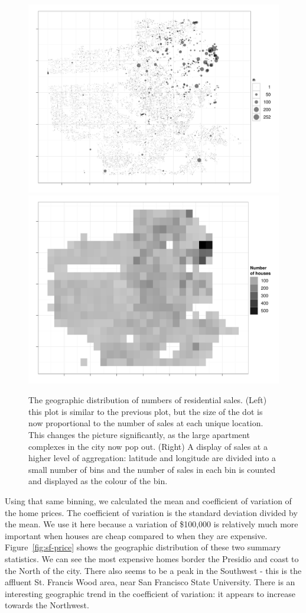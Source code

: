 \documentclass[oneside]{article}
\begin{document}
\begin{figure}[htbp]
  \centering
    \includegraphics[width=0.5\linewidth]{sf-geo-n}%
    \includegraphics[width=0.5\linewidth]{sf-bin-n}
  \caption{The geographic distribution of numbers of residential sales.  (Left) this plot is similar to the previous plot, but the size of the dot is now proportional to the number of sales at each unique location.  This changes the picture significantly, as the large apartment complexes in the city now pop out.  (Right) A display of sales at a higher level of aggregation: latitude and longitude are divided into a small number of bins and the number of sales in each bin is counted and displayed as the colour of the bin.}
  \label{fig:sf-n}
\end{figure}

Using that same binning, we calculated the mean and coefficient of variation of the home prices.  The coefficient of variation is the standard deviation divided by the mean.  We use it here because a variation of \$100,000 is relatively much more important when houses are cheap compared to when they are expensive.  Figure~\ref{fig:sf-price} shows the geographic distribution of these two summary statistics.   We can see the most expensive homes border the Presidio and coast to the North of the city.  There also seems to be a peak in the Southwest - this is the affluent St. Francis Wood area, near San Francisco State University.  There is an interesting geographic trend in the coefficient of variation: it appears to increase towards the Northwest.  
\end{document}
